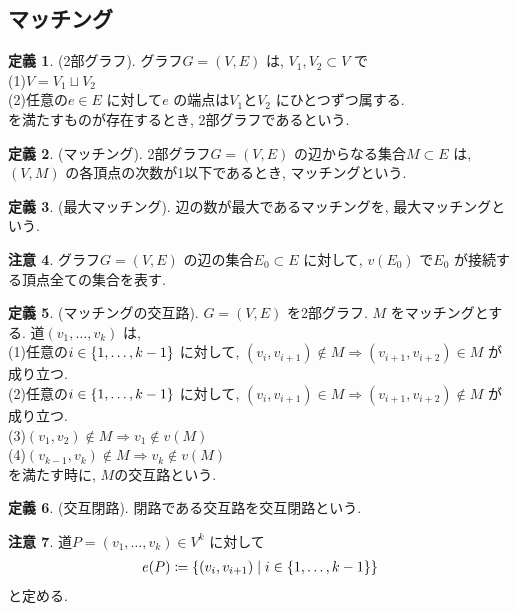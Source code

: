 \documentclass[10pt, fleqn, label-section=none]{bxjsarticle}
\theoremstyle{definition}
\newtheorem{dfn}{定義}[section]
\newtheorem{remark}[dfn]{注意}
\newcommand{\cbra}[1]{\mleft\{#1\mright\}}
\newcommand{\naraba}{\Rightarrow}
\renewcommand{\;}{\, ; \,}
\begin{document}
\subsection{マッチング}



\begin{dfn}(2部グラフ). グラフ$G= (V,E)$ は, $V_1, V_2 \subset V$ で\\
(1)$V = V_1 \sqcup V_2$ \\
(2)任意の$e \in E$ に対して$e$ の端点は$V_1$と$V_2$ にひとつずつ属する. \\
を満たすものが存在するとき, 2部グラフであるという. 
\end{dfn}

\begin{dfn}(マッチング). 2部グラフ$G = (V,E)$ の辺からなる集合$M \subset E$ は, $(V,M)$ の各頂点の次数が1以下であるとき, マッチングという. 

\end{dfn}

\begin{dfn}(最大マッチング). 
辺の数が最大であるマッチングを, 最大マッチングという.
\end{dfn}

\begin{remark}
グラフ$G = (V,E)$ の辺の集合$E_0 \subset E$ に対して, $v(E_0)$ で$E_0$ が接続する頂点全ての集合を表す.
\end{remark}


\begin{dfn}(マッチングの交互路). $G=(V,E)$ を2部グラフ. $M$ をマッチングとする. 道$(v_1, \ldots , v_k)$ は, \\
(1)任意の$i \in \cbra{1, \ldots , k-1}$ に対して, $(v_i, v_{i+1}) \not \in M \naraba (v_{i+1}, v_{i+2}) \in M$ が成り立つ. \\
(2)任意の$i \in \cbra{1, \ldots , k-1}$ に対して, $(v_i, v_{i+1})  \in M \naraba (v_{i+1}, v_{i+2}) \not \in M$ が成り立つ. \\
(3)$(v_1, v_2) \not \in M \naraba v_1 \not \in v(M)$ \\  
(4)$(v_{k-1}, v_k) \not \in M \naraba v_k \not \in v(M)$ \\
を満たす時に, $M$の交互路という. 
\end{dfn}


\begin{dfn}(交互閉路). 閉路である交互路を交互閉路という.
\end{dfn}

\begin{remark}
道$P = (v_1, \ldots , v_k) \in V^k$ に対して
\begin{align*} e(P) \coloneqq  \cbra{(v_i , v_{i+1}) \mid i \in \cbra{1, \ldots , k-1} } \end{align*}
と定める. 
\end{remark}
\end{document}

